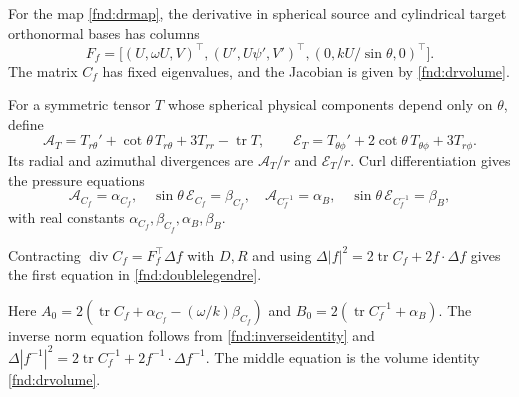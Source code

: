 \documentclass[11pt,a4paper]{article}
\numberwithin{equation}{section}
\theoremstyle{plain}
\theoremstyle{definition}
\theoremstyle{remark}
\begin{document}
For the map \eqref{fnd:drmap}, the derivative in spherical source and cylindrical target orthonormal bases has columns
\[
F_f=\bigl[(U,\omega U,V)^{\top},(U',U\psi',V')^{\top},(0,kU/\sin\theta,0)^{\top}\bigr].
\]
The matrix $C_f$ has fixed eigenvalues, and the Jacobian is given by \eqref{fnd:drvolume}.

For a symmetric tensor $T$ whose spherical physical components depend only on $\theta$, define
\[
\mathcal A_T=T_{r\theta}'+\cot\theta\,T_{r\theta}+3T_{rr}-\operatorname{tr}T,
\qquad
\mathcal E_T=T_{\theta\phi}'+2\cot\theta\,T_{\theta\phi}+3T_{r\phi}.
\]
Its radial and azimuthal divergences are $\mathcal A_T/r$ and $\mathcal E_T/r$. Curl differentiation gives the pressure equations
\begin{equation}\label{fnd:drpressures}
\mathcal A_{C_f}=\alpha_{C_f},\quad \sin\theta\,\mathcal E_{C_f}=\beta_{C_f},
\quad \mathcal A_{C_f^{-1}}=\alpha_B,\quad
\sin\theta\,\mathcal E_{C_f^{-1}}=\beta_B,
\end{equation}
with real constants $\alpha_{C_f},\beta_{C_f},\alpha_B,\beta_B$.

Contracting $\operatorname{div}C_f=F_f^{\top}\Delta f$ with $D,R$ and using $\Delta|f|^2=2\operatorname{tr}C_f+2f\cdot\Delta f$ gives the first equation in \eqref{fnd:doublelegendre}.

Here $A_0=2(\operatorname{tr}C_f+\alpha_{C_f}-(\omega/k)\beta_{C_f})$ and $B_0=2(\operatorname{tr}C_f^{-1}+\alpha_B)$. The inverse norm equation follows from \eqref{fnd:inverseidentity} and $\Delta|f^{-1}|^2=2\operatorname{tr}C_f^{-1}+2f^{-1}\cdot\Delta f^{-1}$. The middle equation is the volume identity \eqref{fnd:drvolume}.
\end{document}
